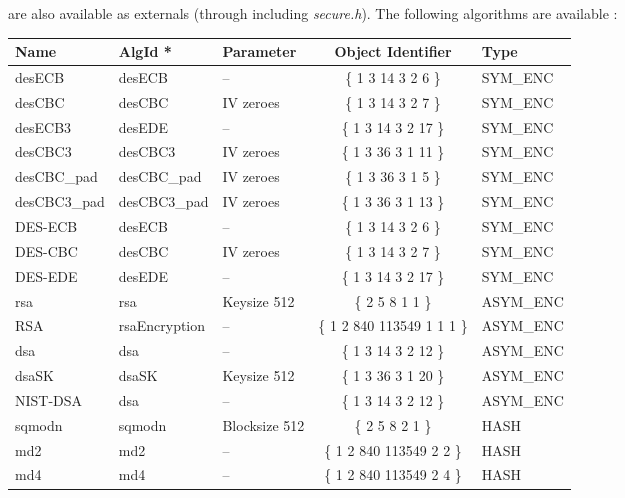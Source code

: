 are also available as externals (through including {\em secure.h}). The 
following algorithms are available :
\bc
{\small
\begin{tabular}{|l|l|l|c|l|} \hline
{\bf Name}      & {\bf AlgId *}      &  {\bf Parameter}  & {\bf Object Identifier}    & {\bf Type}   \\ \hline
desECB          & desECB             &  --               & \{ 1 3 14 3 2 6 \}         & SYM\_ENC \\
desCBC          & desCBC             &  IV zeroes        & \{ 1 3 14 3 2 7 \}         & SYM\_ENC \\
desECB3         & desEDE             &  --               & \{ 1 3 14 3 2 17 \}        & SYM\_ENC \\
desCBC3         & desCBC3            &  IV zeroes        & \{ 1 3 36 3 1 11 \}        & SYM\_ENC \\
desCBC\_pad     & desCBC\_pad        &  IV zeroes        & \{ 1 3 36 3 1 5 \}         & SYM\_ENC \\
desCBC3\_pad    & desCBC3\_pad       &  IV zeroes        & \{ 1 3 36 3 1 13 \}        & SYM\_ENC \\
DES-ECB         & desECB             &  --               & \{ 1 3 14 3 2 6 \}         & SYM\_ENC \\
DES-CBC         & desCBC             &  IV zeroes        & \{ 1 3 14 3 2 7 \}         & SYM\_ENC \\
DES-EDE         & desEDE             &  --               & \{ 1 3 14 3 2 17 \}        & SYM\_ENC \\ rsa             & rsa                &  Keysize 512      & \{ 2 5 8 1 1 \}            & ASYM\_ENC \\
RSA             & rsaEncryption      &  --               & \{ 1 2 840 113549 1 1 1 \} & ASYM\_ENC \\
dsa             & dsa                &  --               & \{ 1 3 14 3 2 12 \}        & ASYM\_ENC \\
dsaSK           & dsaSK              &  Keysize 512      & \{ 1 3 36 3 1 20 \}        & ASYM\_ENC \\
NIST-DSA        & dsa                &  --               & \{ 1 3 14 3 2 12 \}        & ASYM\_ENC \\
sqmodn          & sqmodn             &  Blocksize 512    & \{ 2 5 8 2 1 \}            & HASH \\
md2             & md2                &  --               & \{ 1 2 840 113549 2 2 \}   & HASH \\
md4             & md4                &  --               & \{ 1 2 840 113549 2 4 \}   & HASH \\

\end{tabular}}
